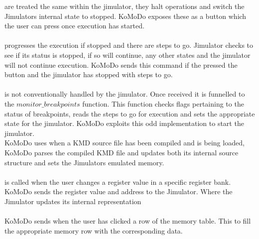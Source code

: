 %
 are treated the same within the jimulator, they halt operations and switch the Jimulators internal state to stopped. KoMoDo exposes these as a button which the user can press once execution has started.\\\\
%
 progresses the execution if stopped and there are steps to go. Jimulator checks to see if its status is stopped, if so will continue, any other states and the jimulator will not continue execution. KoMoDo sends this command if the pressed the button and the jimulator has stopped with steps to go.\\\\
%
 is not conventionally handled by the jimulator. Once received it is funnelled to the $monitor\_breakpoints$ function. This function checks flags pertaining to the status of breakpoints, reads the steps to go for execution and sets the appropriate state for the jimulator. KoMoDo exploits this odd implementation to start the jimulator.\\
%
%
%
%
KoMoDo uses  when a KMD source file has been compiled and is being loaded, KoMoDo parses the compiled KMD file and updates both its internal source structure and sets the Jimulators emulated memory.\\\\
%
 is called when the user changes a register value in a specific register bank. KoMoDo sends the register value and address to the Jimulator. Where the Jimulator updates its internal representation\\\\
%
KoMoDo sends  when the user has clicked a row of the memory table. This to fill the appropriate memory row with the corresponding data.\\\\
